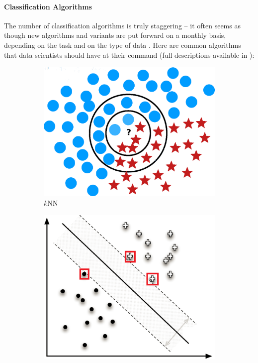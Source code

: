 \paragraph{Classification Algorithms}
The number of classification algorithms is truly staggering -- it often seems as though new algorithms and variants are put forward on a monthly basis, depending on the task and on the type of data \cite{DSML_CS10}. Here are common algorithms that data scientists should have at their command (full descriptions available in \cite{DSML_T,DSML_HTF,DSML_PF}): 
\begin{figure}[!t]
\centering
\begin{subfigure}[b]{0.45\textwidth}
\includegraphics[height=0.25\textheight]{images/DSML/knn.png}
\caption{\small $k$NN}\label{fig:class2a}
\end{subfigure}
\begin{subfigure}[b]{0.45\textwidth}
\includegraphics[height=0.25\textheight]{images/DSML/SVM.png}

\end{subfigure}
\end{figure}
